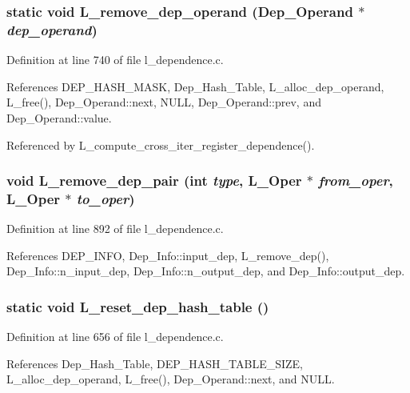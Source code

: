 \subsubsection{\setlength{\rightskip}{0pt plus 5cm}static void L\_\-remove\_\-dep\_\-operand (\bf{Dep\_\-Operand} $\ast$ {\em dep\_\-operand})\hspace{0.3cm}{\tt  [static]}}\label{l__dependence_8c_5076f563e1903d57d7d790e9a39b1d2f}




Definition at line 740 of file l\_\-dependence.c.

References DEP\_\-HASH\_\-MASK, Dep\_\-Hash\_\-Table, L\_\-alloc\_\-dep\_\-operand, L\_\-free(), Dep\_\-Operand::next, NULL, Dep\_\-Operand::prev, and Dep\_\-Operand::value.

Referenced by L\_\-compute\_\-cross\_\-iter\_\-register\_\-dependence().
\subsubsection{\setlength{\rightskip}{0pt plus 5cm}void L\_\-remove\_\-dep\_\-pair (int {\em type}, L\_\-Oper $\ast$ {\em from\_\-oper}, L\_\-Oper $\ast$ {\em to\_\-oper})}\label{l__dependence_8c_aae239e60591b789360532409a5547d0}




Definition at line 892 of file l\_\-dependence.c.

References DEP\_\-INFO, Dep\_\-Info::input\_\-dep, L\_\-remove\_\-dep(), Dep\_\-Info::n\_\-input\_\-dep, Dep\_\-Info::n\_\-output\_\-dep, and Dep\_\-Info::output\_\-dep.
\subsubsection{\setlength{\rightskip}{0pt plus 5cm}static void L\_\-reset\_\-dep\_\-hash\_\-table ()\hspace{0.3cm}{\tt  [static]}}\label{l__dependence_8c_03b4cfd22ea7fd297e696ea6edcb6dcc}




Definition at line 656 of file l\_\-dependence.c.

References Dep\_\-Hash\_\-Table, DEP\_\-HASH\_\-TABLE\_\-SIZE, L\_\-alloc\_\-dep\_\-operand, L\_\-free(), Dep\_\-Operand::next, and NULL.
